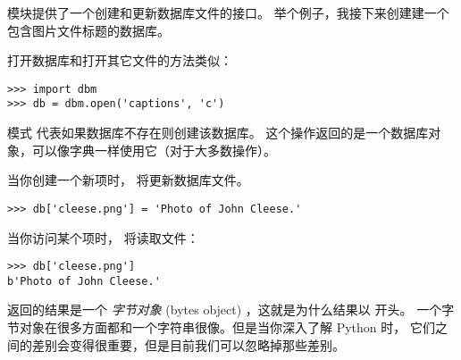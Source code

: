 {{{{{{{ 模块提供了一个创建和更新数据库文件的接口。
举个例子，我接下来创建建一个包含图片文件标题的数据库。

  


打开数据库和打开其它文件的方法类似：

\begin{lstlisting}
>>> import dbm
>>> db = dbm.open('captions', 'c')
\end{lstlisting}

%

模式  代表如果数据库不存在则创建该数据库。
这个操作返回的是一个数据库对象，可以像字典一样使用它（对于大多数操作）。

  


当你创建一个新项时， 将更新数据库文件。


\begin{lstlisting}
>>> db['cleese.png'] = 'Photo of John Cleese.'
\end{lstlisting}

%

当你访问某个项时， 将读取文件：

\begin{lstlisting}
>>> db['cleese.png']
b'Photo of John Cleese.'
\end{lstlisting}

%

返回的结果是一个 {\em 字节对象} (bytes object) ，这就是为什么结果以  开头。
一个字节对象在很多方面都和一个字符串很像。但是当你深入了解 Python 时，
它们之间的差别会变得很重要，但是目前我们可以忽略掉那些差别。

  


}}}}}}}
